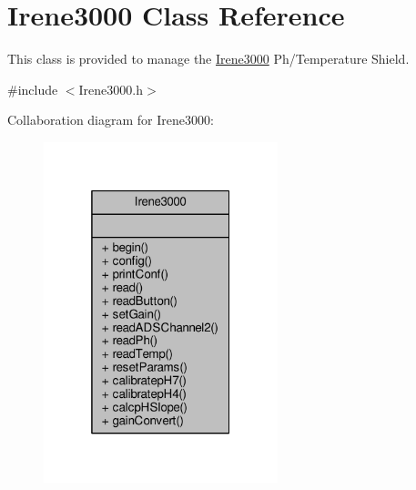 \hypertarget{class_irene3000}{}\section{Irene3000 Class Reference}
\label{class_irene3000}


This class is provided to manage the \hyperlink{class_irene3000}{Irene3000} Ph/\+Temperature Shield.  




{\ttfamily \#include $<$Irene3000.\+h$>$}



Collaboration diagram for Irene3000\+:\nopagebreak
\begin{figure}[H]
\begin{center}
\leavevmode
\includegraphics[width=193pt]{class_irene3000__coll__graph}
\end{center}
\end{figure}
